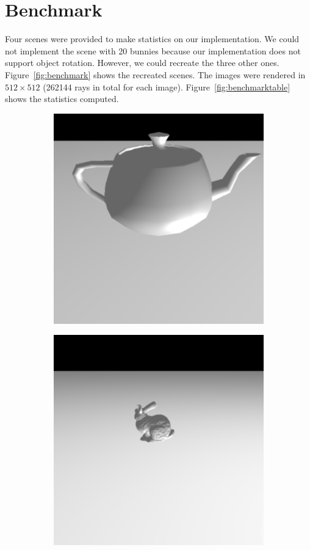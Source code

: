 \documentclass[a4paper,11pt]{article}%
\begin{document}
\section{Benchmark}

Four scenes were provided to make statistics on our implementation. We could not implement the scene with 20 bunnies because our implementation does not support object rotation.
However, we could recreate the three other ones. Figure~\ref{fig:benchmark} shows the recreated scenes. The images were rendered in $512\times512$ (262144 rays in total for each image).
Figure~\ref{fig:benchmarktable} shows the statistics computed.

\begin{figure}[h]
    \centering
    
\begin{subfigure}{.3\textwidth}
  \centering
  \includegraphics[width=.9\linewidth]{img/benchmarkteapot.png}
\end{subfigure}%
\begin{subfigure}{.3\textwidth}
  \centering
  \includegraphics[width=.9\linewidth]{img/benchmarkbunny.png}

\end{subfigure}
\end{figure}
\end{document}
